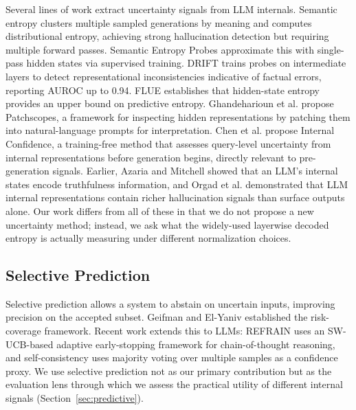 \documentclass{ieeeaccess}
\begin{document}
Several lines of work extract uncertainty signals from LLM internals. Semantic entropy \cite{kuhn2023semantic, farquhar2024semantic} clusters multiple sampled generations by meaning and computes distributional entropy, achieving strong hallucination detection but requiring multiple forward passes. Semantic Entropy Probes \cite{kossen2024seps} approximate this with single-pass hidden states via supervised training. DRIFT \cite{bhatnagar2026drift} trains probes on intermediate layers to detect representational inconsistencies indicative of factual errors, reporting AUROC up to 0.94. FLUE \cite{gao2025flue} establishes that hidden-state entropy provides an upper bound on predictive entropy. Ghandeharioun et al. \cite{ghandeharioun2024patchscopes} propose Patchscopes, a framework for inspecting hidden representations by patching them into natural-language prompts for interpretation. Chen et al. \cite{chen2025querylevel} propose Internal Confidence, a training-free method that assesses query-level uncertainty from internal representations before generation begins, directly relevant to pre-generation signals. Earlier, Azaria and Mitchell \cite{azaria2023internal} showed that an LLM's internal states encode truthfulness information, and Orgad et al. \cite{orgad2025llms} demonstrated that LLM internal representations contain richer hallucination signals than surface outputs alone. Our work differs from all of these in that we do not propose a new uncertainty method; instead, we ask what the widely-used layerwise decoded entropy is actually measuring under different normalization choices.

\subsection{Selective Prediction}

Selective prediction allows a system to abstain on uncertain inputs, improving precision on the accepted subset. Geifman and El-Yaniv \cite{geifman2017selective} established the risk-coverage framework. Recent work extends this to LLMs: REFRAIN \cite{sun2025refrain} uses an SW-UCB-based adaptive early-stopping framework for chain-of-thought reasoning, and self-consistency \cite{wang2023selfconsistency} uses majority voting over multiple samples as a confidence proxy. We use selective prediction not as our primary contribution but as the evaluation lens through which we assess the practical utility of different internal signals (Section~\ref{sec:predictive}).


\end{document}

